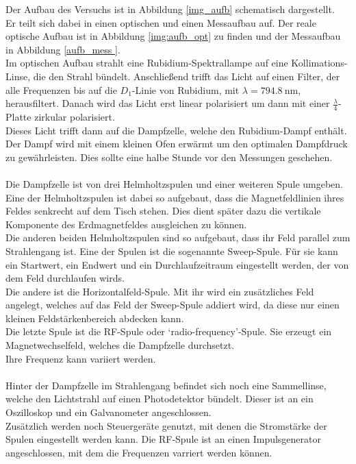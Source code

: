 \noindent
Der Aufbau des Versuchs ist in Abbildung \ref{img_aufb} schematisch dargestellt.\\
Er teilt sich dabei in einen optischen und einen Messaufbau auf. Der reale optische Aufbau ist in Abbildung
\ref{img:aufb_opt} zu finden und der Messaufbau in Abbildung \ref{aufb_mess }.\\
Im optischen Aufbau strahlt eine Rubidium-Spektrallampe auf eine Kollimations-Linse, die den Strahl bündelt.
Anschließend trifft das Licht auf einen Filter, der alle Frequenzen bis auf die $D_1$-Linie von Rubidium, 
mit $\lambda = \SI{794.8}{\nano\metre}$, herausfiltert. Danach wird das Licht erst linear polarisiert um dann mit einer $\frac{\lambda}{4}$-Platte zirkular polarisiert.\\
Dieses Licht trifft dann auf die Dampfzelle, welche den Rubidium-Dampf enthält. 
Der Dampf wird mit einem kleinen Ofen erwärmt um den optimalen Dampfdruck zu gewährleisten.
Dies sollte eine halbe Stunde vor den Messungen geschehen.\\\\
Die Dampfzelle ist von drei Helmholtzspulen und einer weiteren Spule umgeben.\\
Eine der Helmholtzspulen ist dabei so aufgebaut, dass die Magnetfeldlinien ihres Feldes senkrecht auf dem Tisch stehen.
Dies dient später dazu die vertikale Komponente des Erdmagnetfeldes ausgleichen zu können.\\
Die anderen beiden Helmholtzspulen sind so aufgebaut, dass ihr Feld parallel zum Strahlengang ist.
Eine der Spulen ist die sogenannte Sweep-Spule. 
Für sie kann ein Startwert, ein Endwert und ein Durchlaufzeitraum eingestellt werden, der von dem Feld durchlaufen wirds.\\
Die andere ist die Horizontalfeld-Spule. 
Mit ihr wird ein zusätzliches Feld angelegt, welches auf das Feld der Sweep-Spule addiert wird, da diese nur einen kleinen Feldstärkenbereich abdecken kann.\\
Die letzte Spule ist die RF-Spule oder \enquote*{radio-frequency}-Spule. 
Sie erzeugt ein Magnetwechselfeld, welches die Dampfzelle durchsetzt.\\
Ihre Frequenz kann variiert werden.\\\\ 
Hinter der Dampfzelle im Strahlengang befindet sich noch eine Sammellinse, welche den Lichtstrahl auf einen Photodetektor bündelt.
Dieser ist an ein Oszilloskop und ein Galvanometer angeschlossen.\\
Zusätzlich werden noch Steuergeräte genutzt, mit denen die Stromstärke der Spulen eingestellt werden kann.
Die RF-Spule ist an einen Impulsgenerator angeschlossen, mit dem die Frequenzen varriert werden können.\\


